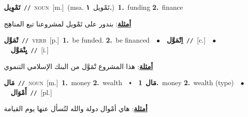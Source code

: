 \documentclass[10pt,a4paper,twoside]{article} %
\begin{document}
\begin{multicols}{2}
{\setlength\topsep{0pt}\textbf{\foreignlanguage{arabic}{تَمْوِيل}}\ {\color{gray}\texttt{//}\color{black}}\ \textsc{noun}\ [m.]\ \color{gray}(msa. \foreignlanguage{arabic}{تَمْويل}~\foreignlanguage{arabic}{\textbf{١.}})\color{black}\ \textbf{1.}~funding  \textbf{2.}~finance\  \begin{flushright}\color{gray}\foreignlanguage{arabic}{\textbf{\underline{\foreignlanguage{arabic}{أمثلة}}}: بندور على تَمْويل لمشروعنا تبع المناهِج}\end{flushright}\color{black}} \vspace{2mm}

{\setlength\topsep{0pt}\textbf{\foreignlanguage{arabic}{تْمَوَّل}}\ {\color{gray}\texttt{//}\color{black}}\ \textsc{verb}\ [p.]\ \textbf{1.}~be funded.  \textbf{2.}~be financed\ \ $\bullet$\ \ \setlength\topsep{0pt}\textbf{\foreignlanguage{arabic}{اِتْمَوَّل}}\ {\color{gray}\texttt{//}\color{black}}\ [c.]\ \ $\bullet$\ \ \setlength\topsep{0pt}\textbf{\foreignlanguage{arabic}{يِتْمَوَّل}}\ {\color{gray}\texttt{//}\color{black}}\ [i.]\  \begin{flushright}\color{gray}\foreignlanguage{arabic}{\textbf{\underline{\foreignlanguage{arabic}{أمثلة}}}: هذا المشروع تْمَوَّل من البنك الإسلامي التنموي}\end{flushright}\color{black}} \vspace{2mm}

{\setlength\topsep{0pt}\textbf{\foreignlanguage{arabic}{مَال}}\ {\color{gray}\texttt{//}\color{black}}\ \textsc{noun}\ [m.]\ \textbf{1.}~money  \textbf{2.}~wealth\ \ $\smblkdiamond$\ \ \setlength\topsep{0pt}\textbf{\foreignlanguage{arabic}{مَال}}\ \textbf{1.}~money  \textbf{2.}~wealth (type)\ \ $\bullet$\ \ \setlength\topsep{0pt}\textbf{\foreignlanguage{arabic}{أَمْوَال}}\ {\color{gray}\texttt{//}\color{black}}\ [pl.]\  \begin{flushright}\color{gray}\foreignlanguage{arabic}{\textbf{\underline{\foreignlanguage{arabic}{أمثلة}}}: هاي أمْوال دولة والله لتُسأل عنها يوم القيامة}\end{flushright}\color{black}} \vspace{2mm}


\end{multicols}
\end{document}
